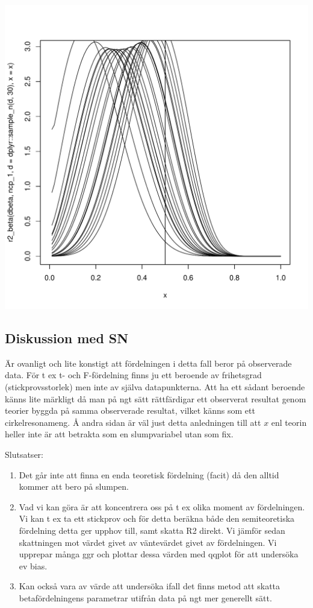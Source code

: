 \documentclass[]{article}
\providecommand{\tightlist}{%
  \setlength{\itemsep}{0pt}\setlength{\parskip}{0pt}}
\begin{document}
\includegraphics{2016_w09_files/figure-latex/unnamed-chunk-4-1.pdf}

\subsection{Diskussion med SN}\label{diskussion-med-sn}

Är ovanligt och lite konstigt att fördelningen i detta fall beror på
observerade data. För t ex t- och F-fördelning finns ju ett beroende av
frihetsgrad (stickprovsstorlek) men inte av själva datapunkterna. Att ha
ett sådant beroende känns lite märkligt då man på ngt sätt rättfärdigar
ett observerat resultat genom teorier byggda på samma observerade
resultat, vilket känns som ett cirkelresonameng. Å andra sidan är väl
just detta anledningen till att \(x\) enl teorin heller inte är att
betrakta som en slumpvariabel utan som fix.

Slutsatser:

\begin{enumerate}
\def\labelenumi{\arabic{enumi}.}
\tightlist
\item
  Det går inte att finna en enda teoretisk fördelning (facit) då den
  alltid kommer att bero på slumpen.
\item
  Vad vi kan göra är att koncentrera oss på t ex olika moment av
  fördelningen. Vi kan t ex ta ett stickprov och för detta beräkna både
  den semiteoretiska fördelning detta ger upphov till, samt skatta R2
  direkt. Vi jämför sedan skattningen mot värdet givet av väntevärdet
  givet av fördelningen. Vi upprepar många ggr och plottar dessa värden
  med qqplot för att undersöka ev bias.
\item
  Kan också vara av värde att undersöka ifall det finns metod att skatta
  betafördelningens parametrar utifrån data på ngt mer generellt sätt.
\end{enumerate}
\end{document}
